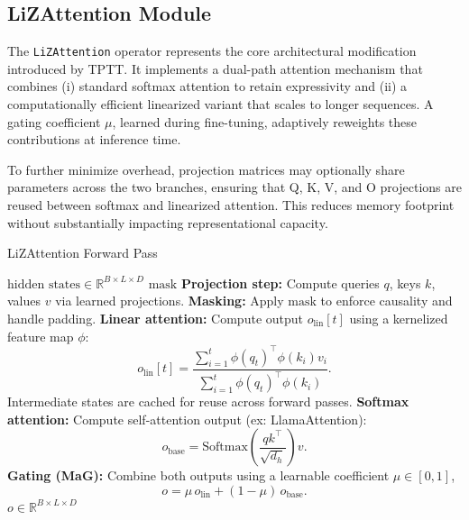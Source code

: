 \documentclass[10pt,a4paper]{article}
\begin{document}
\subsection{LiZAttention Module}

The \texttt{LiZAttention} operator represents the core architectural modification introduced by TPTT. It implements a dual-path attention mechanism that combines (i) standard softmax attention to retain expressivity and (ii) a computationally efficient linearized variant that scales to longer sequences. A gating coefficient $\mu$, learned during fine-tuning, adaptively reweights these contributions at inference time.

To further minimize overhead, projection matrices may optionally share parameters across the two branches, ensuring that Q, K, V, and O projections are reused between softmax and linearized attention. This reduces memory footprint without substantially impacting representational capacity.

\begin{algorithm}[H]
\caption{LiZAttention Forward Pass}
\label{alg:lizattention}
\begin{algorithmic}[1]
\Require $\text{hidden states} \in \mathbb{R}^{B \times L \times D}$ 
\Require $\text{mask}$ 
\State \textbf{Projection step:} Compute queries $q$, keys $k$, values $v$ via learned projections.
\State \textbf{Masking:} Apply $\text{mask}$ to enforce causality and handle padding.
\State \textbf{Linear attention:} Compute output $o_{\mathrm{lin}}[t]$ using a kernelized feature map $\phi$:
\begin{equation*}
o_{\mathrm{lin}}[t] = \frac{\sum_{i=1}^{t} \phi(q_t)^\top \phi(k_i) v_i}{\sum_{i=1}^{t} \phi(q_t)^\top \phi(k_i)}.
\end{equation*}
Intermediate states are cached for reuse across forward passes.
\State \textbf{Softmax attention:} Compute self-attention output (ex: LlamaAttention):
\begin{equation*}
o_{\mathrm{base}} = \text{Softmax}\left(\frac{q k^\top}{\sqrt{d_h}}\right) v.
\end{equation*}
\State \textbf{Gating (MaG):} Combine both outputs using a learnable coefficient $\mu \in [0,1]$,
\begin{equation*}
o = \mu \, o_{\mathrm{lin}} + (1-\mu) \, o_{\mathrm{base}}.
\end{equation*}
\State \Return $o \in \mathbb{R}^{B \times L \times D}$
\end{algorithmic}
\end{algorithm}
\end{document}
